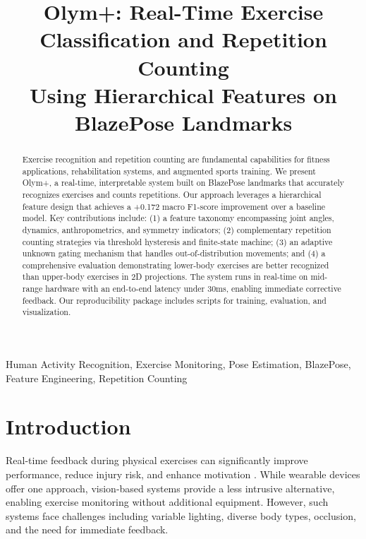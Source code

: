 \documentclass[conference]{IEEEtran}
\begin{document}
\title{Olym+: Real-Time Exercise Classification and Repetition Counting\\Using Hierarchical Features on BlazePose Landmarks}

\author{
}

\maketitle

\begin{abstract}
Exercise recognition and repetition counting are fundamental capabilities for fitness applications, rehabilitation systems, and augmented sports training. We present Olym+, a real-time, interpretable system built on BlazePose landmarks that accurately recognizes exercises and counts repetitions. Our approach leverages a hierarchical feature design that achieves a +0.172 macro F1-score improvement over a baseline model. Key contributions include: (1) a feature taxonomy encompassing joint angles, dynamics, anthropometrics, and symmetry indicators; (2) complementary repetition counting strategies via threshold hysteresis and finite-state machine; (3) an adaptive unknown gating mechanism that handles out-of-distribution movements; and (4) a comprehensive evaluation demonstrating lower-body exercises are better recognized than upper-body exercises in 2D projections. The system runs in real-time on mid-range hardware with an end-to-end latency under 30ms, enabling immediate corrective feedback. Our reproducibility package includes scripts for training, evaluation, and visualization.
\end{abstract}

\begin{IEEEkeywords}
Human Activity Recognition, Exercise Monitoring, Pose Estimation, BlazePose, Feature Engineering, Repetition Counting
\end{IEEEkeywords}

\section{Introduction}
Real-time feedback during physical exercises can significantly improve performance, reduce injury risk, and enhance motivation \cite{feedback_study}. While wearable devices offer one approach, vision-based systems provide a less intrusive alternative, enabling exercise monitoring without additional equipment. However, such systems face challenges including variable lighting, diverse body types, occlusion, and the need for immediate feedback.
\end{document}
